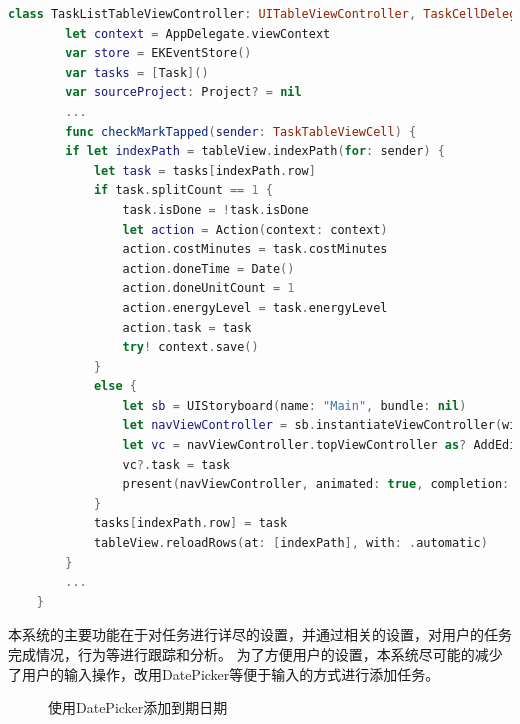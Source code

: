 \begin{lstlisting}[language={Swift}, caption={TaskListTableViewController实现代理的相关代码}]
	class TaskListTableViewController: UITableViewController, TaskCellDelegate {
		let context = AppDelegate.viewContext
		var store = EKEventStore()
		var tasks = [Task]()
		var sourceProject: Project? = nil
		...
		func checkMarkTapped(sender: TaskTableViewCell) {
        if let indexPath = tableView.indexPath(for: sender) {
            let task = tasks[indexPath.row]
            if task.splitCount == 1 {
                task.isDone = !task.isDone
                let action = Action(context: context)
                action.costMinutes = task.costMinutes
                action.doneTime = Date()
                action.doneUnitCount = 1
                action.energyLevel = task.energyLevel
                action.task = task
                try! context.save()
            }
            else {
                let sb = UIStoryboard(name: "Main", bundle: nil)
                let navViewController = sb.instantiateViewController(withIdentifier: "navAEAction") as! UINavigationController
                let vc = navViewController.topViewController as? AddEditActionTableViewController
                vc?.task = task
                present(navViewController, animated: true, completion: nil)
            }
            tasks[indexPath.row] = task
            tableView.reloadRows(at: [indexPath], with: .automatic)
		}
		...
    }
\end{lstlisting}

本系统的主要功能在于对任务进行详尽的设置，并通过相关的设置，对用户的任务完成情况，行为等进行跟踪和分析。
为了方便用户的设置，本系统尽可能的减少了用户的输入操作，改用DatePicker等便于输入的方式进行添加任务。

\begin{figure}[H]
	\centering
	\caption{使用DatePicker添加到期日期}
\end{figure}

